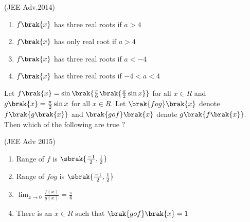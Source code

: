\hfill(JEE Adv.2014)
\begin{enumerate} 
\item $f\brak{x}$ has three real roots if $a>4$
\item $f\brak{x}$ has only real root if $a>4$
\item $f\brak{x}$ has three real roots if $a<-4$
\item $f\brak{x}$ has three real roots if $-4<a<4$
\end{enumerate}
\item Let $f\brak{x}=\sin\brak{\frac{\pi}{6}\brak{\frac{\pi}{2}\sin{x}}}$ for all $x \in R $ and $g\brak{x}=\frac{\pi}{2}\sin{x}$ for all $x \in R$. Let $\brak{fog}\brak{x}$ denote $f\brak{g\brak{x}}$ and $\brak{gof}\brak{x}$ denote $g\brak{f\brak{x}}.$ Then which of the following are true $?$

\hfill(JEE Adv 2015)
\begin{enumerate} 
\item Range of $f$ is $\sbrak{\frac{-1}{2},\frac{1}{2}}$
\item Range of $fog$ is $\sbrak{\frac{-1}{2},\frac{1}{2}}$
\item $\lim_{x\rightarrow{0}}\frac{f(x)}{g(x)}=\frac{\pi}{6}$
\item There is an $x \in R$ such that $\brak{gof}\brak{x}=1$
\end{enumerate}
